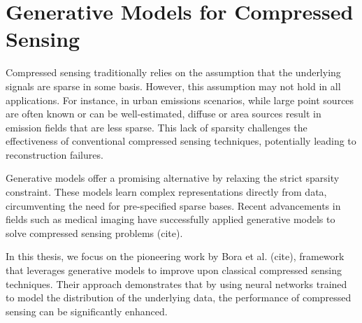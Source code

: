\section{Generative Models for Compressed Sensing}

Compressed sensing traditionally relies on the assumption that the underlying signals are sparse in some basis.
However, this assumption may not hold in all applications.
For instance, in urban emissions scenarios, while large point sources are often known or can be well-estimated, diffuse or area sources result in emission fields that are less sparse.
This lack of sparsity challenges the effectiveness of conventional compressed sensing techniques, potentially leading to reconstruction failures.

Generative models offer a promising alternative by relaxing the strict sparsity constraint.
These models learn complex representations directly from data, circumventing the need for pre-specified sparse bases.
Recent advancements in fields such as medical imaging have successfully applied generative models to solve compressed sensing problems (cite). %

In this thesis, we focus on the pioneering work by Bora et al. (cite), framework that leverages generative models to improve upon classical compressed sensing techniques.
Their approach demonstrates that by using neural networks trained to model the distribution of the underlying data, the performance of compressed sensing can be significantly enhanced.

